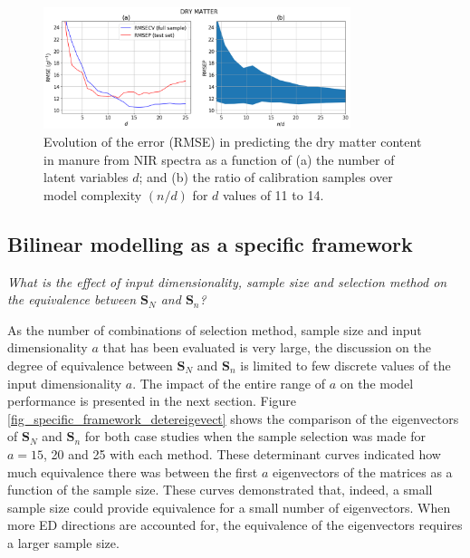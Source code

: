 \documentclass[journal=ancham,manuscript=article]{achemso}
\begin{document}
\begin{figure}[b]
\includegraphics[width=0.8\textwidth]{manuscript/figures/d02_manure_general_framework.png}
\centering
\caption{Evolution of the error (RMSE) in predicting the dry matter content in manure from NIR spectra as a function of (a) the number of latent variables $d$; and (b) the ratio of calibration samples over model complexity $(n/d)$ for $d$ values of 11 to 14.}
\label{fig_d02_manure_general_framework}
\end{figure}

\subsection*{Bilinear modelling as a specific framework}\label{results:specframework}

\emph{What is the effect of input dimensionality, sample size and selection method on the equivalence between $\mathbf{S}_N$ and $\mathbf{S}_n$?} 

As the number of combinations of selection method, sample size and input dimensionality $a$ that has been evaluated is very large, the discussion on the degree of equivalence between $\mathbf{S}_N$ and $\mathbf{S}_n$ is limited to few discrete values of the input dimensionality $a$. The impact of the entire range of $a$ on the model performance is presented in the next section. Figure \ref{fig_specific_framework_detereigevect} shows the comparison of the eigenvectors of $\mathbf{S}_N$ and $\mathbf{S}_n$ for both case studies when the sample selection was made for $a=15$, 20 and 25 with each method. These determinant curves indicated how much equivalence there was between the first $a$ eigenvectors of the matrices as a function of the sample size. These curves demonstrated that, indeed, a small sample size could provide equivalence for a small number of eigenvectors. When more ED directions are accounted for, the equivalence of the eigenvectors requires a larger sample size. 
\end{document}
